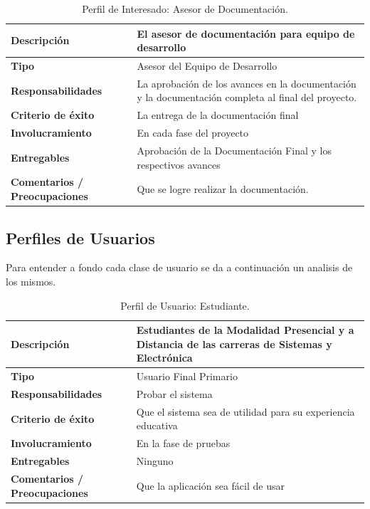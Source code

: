 \pagebreak

\begin{table}[h!]
  \begin{tabular}{|p{}|p{}|}
    \hline
    \textbf{Descripción} & El asesor de documentación para equipo de desarrollo \\
    \hline
    \textbf{Tipo} & Asesor del Equipo de Desarrollo \\
    \hline
    \textbf{Responsabilidades} & La aprobación de los avances en la documentación y la documentación completa al final del proyecto. \\
    \hline
    \textbf{Criterio de éxito} & La entrega de la documentación final \\
    \hline
    \textbf{Involucramiento} & En cada fase del proyecto \\
    \hline
    \textbf{Entregables} & Aprobación de la Documentación Final y los respectivos avances \\
    \hline
    \textbf{Comentarios / Preocupaciones} & Que se logre realizar la documentación. \\
    \hline
  \end{tabular}
  \caption{Perfil de Interesado: Asesor de Documentación.}
  \label{per-inter-a-doc}
\end{table}

\vfill

\subsection{Perfiles de Usuarios}
Para entender a fondo cada clase de usuario se da a continuación un analisis de los mismos.

\begin{table}[h!]
  \begin{tabular}{|p{}|p{}|}
    \hline
    \textbf{Descripción} & Estudiantes de la Modalidad Presencial y a Distancia de las carreras de Sistemas y Electrónica \\
    \hline
    \textbf{Tipo} & Usuario Final Primario \\
    \hline
    \textbf{Responsabilidades} & Probar el sistema \\
    \hline
    \textbf{Criterio de éxito} & Que el sistema sea de utilidad para su experiencia educativa \\
    \hline
    \textbf{Involucramiento} & En la fase de pruebas \\
    \hline
    \textbf{Entregables} & Ninguno \\
    \hline
    \textbf{Comentarios / Preocupaciones} & Que la aplicación sea fácil de usar \\
    \hline
  \end{tabular}
  \caption{Perfil de Usuario: Estudiante.}
  \label{per-user-estu}
\end{table}

